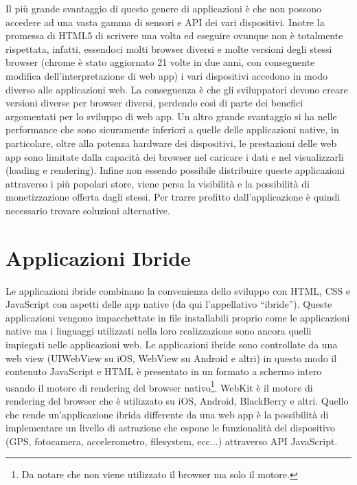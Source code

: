         Il più grande svantaggio di questo genere di applicazioni è che non
        possono accedere ad una vasta gamma di sensori e API dei vari
        dispositivi. Inotre la promessa di HTML5 di scrivere una volta ed eseguire
        ovunque non è totalmente rispettata, infatti, essendoci molti browser
        diversi e molte versioni degli stessi browser (chrome è stato aggiornato
        21 volte in due anni, con conseguente modifica dell'interpretazione di
        web app\citep{White:Native-vs-Html}) i vari dispositivi accedono in modo
        diverso alle applicazioni web. La conseguenza è che gli sviluppatori
        devono creare versioni diverse per browser diversi, perdendo così di
        parte dei benefici argomentati per lo sviluppo di web app. Un
        altro grande svantaggio si ha nelle performance che sono sicuramente
        inferiori a quelle delle applicazioni native, in particolare, oltre
        alla potenza hardware dei dispositivi, le prestazioni delle web app
        sono limitate dalla capacità dei browser nel
        caricare i dati e nel visualizzarli (loading e rendering). Infine non
        essendo possibile distribuire queste applicazioni attraverso i più
        popolari store, viene persa la visibilità e la possibilità di
        monetizzazione offerta dagli stessi. Per trarre profitto
        dall'applicazione è quindi necessario trovare soluzioni alternative.

    \section{Applicazioni Ibride}
        Le applicazioni ibride combinano la convenienza dello sviluppo con HTML,
        CSS e JavaScript con aspetti delle app native (da qui l'appellativo
        ``ibride''). Queste applicazioni vengono impacchettate in file
        installabili proprio come le applicazioni native ma i linguaggi
        utilizzati nella loro realizzazione sono ancora quelli impiegati nelle
        applicazioni web. Le applicazioni ibride sono controllate da una web
        view (UIWebView su iOS, WebView su Android e altri) in questo modo il
        contenuto JavaScript e HTML è  presentato in un formato a schermo
        intero usando il motore di rendering del browser nativo\footnote{Da
        notare che non viene utilizzato il browser ma solo il motore.}. WebKit è
        il motore di rendering del browser che è utilizzato su iOS, Android,
        BlackBerry e altri. Quello che rende un'applicazione ibrida differente
        da una web app è la possibilità di implementare un livello di astrazione
        che espone le funzionalità del dispositivo (GPS, fotocamera,
        accelerometro, filesystem, ecc...) attraverso API JavaScript.

